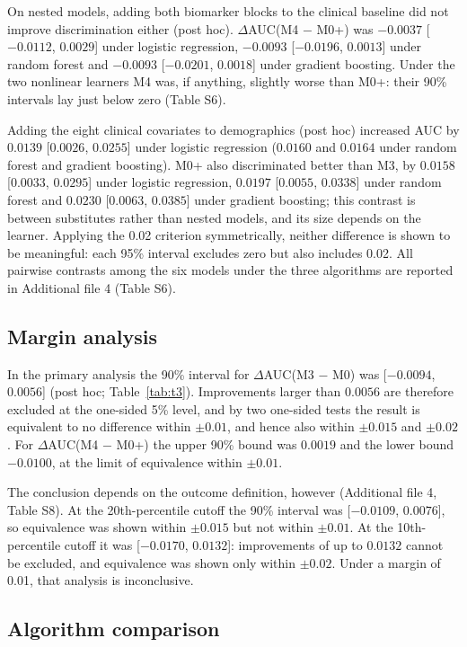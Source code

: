 \documentclass[12pt]{article}
\newcommand{\deltaauc}{$\Delta$AUC}
\begin{document}
On nested models, adding both biomarker blocks to the clinical baseline did not improve discrimination either (post hoc). \deltaauc(M4 $-$ M0+) was $-0.0037$ [$-0.0112$, $0.0029$] under logistic regression, $-0.0093$ [$-0.0196$, $0.0013$] under random forest and $-0.0093$ [$-0.0201$, $0.0018$] under gradient boosting. Under the two nonlinear learners M4 was, if anything, slightly worse than M0+: their 90\% intervals lay just below zero (Table S6).

Adding the eight clinical covariates to demographics (post hoc) increased AUC by $0.0139$ [$0.0026$, $0.0255$] under logistic regression ($0.0160$ and $0.0164$ under random forest and gradient boosting). M0+ also discriminated better than M3, by $0.0158$ [$0.0033$, $0.0295$] under logistic regression, $0.0197$ [$0.0055$, $0.0338$] under random forest and $0.0230$ [$0.0063$, $0.0385$] under gradient boosting; this contrast is between substitutes rather than nested models, and its size depends on the learner. Applying the 0.02 criterion symmetrically, neither difference is shown to be meaningful: each 95\% interval excludes zero but also includes 0.02. All pairwise contrasts among the six models under the three algorithms are reported in Additional file 4 (Table S6).

\subsection*{Margin analysis}

In the primary analysis the 90\% interval for \deltaauc(M3 $-$ M0) was [$-0.0094$, $0.0056$] (post hoc; Table~\ref{tab:t3}). Improvements larger than $0.0056$ are therefore excluded at the one-sided 5\% level, and by two one-sided tests the result is equivalent to no difference within $\pm 0.01$, and hence also within $\pm 0.015$ and $\pm 0.02$. For \deltaauc(M4 $-$ M0+) the upper 90\% bound was $0.0019$ and the lower bound $-0.0100$, at the limit of equivalence within $\pm 0.01$.

The conclusion depends on the outcome definition, however (Additional file 4, Table S8). At the 20th-percentile cutoff the 90\% interval was [$-0.0109$, $0.0076$], so equivalence was shown within $\pm 0.015$ but not within $\pm 0.01$. At the 10th-percentile cutoff it was [$-0.0170$, $0.0132$]: improvements of up to $0.0132$ cannot be excluded, and equivalence was shown only within $\pm 0.02$. Under a margin of 0.01, that analysis is inconclusive.

\subsection*{Algorithm comparison}
\end{document}
